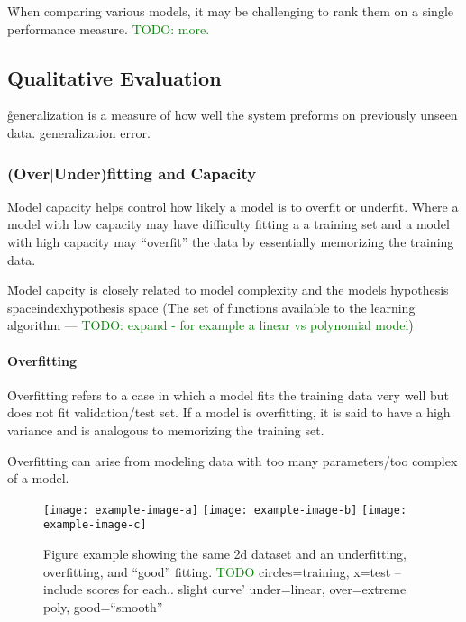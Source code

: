 \r{When comparing various models, it may be challenging to rank them on a single performance measure. \textcolor{green}{TODO: more.}}

\subsection{Qualitative Evaluation}

\r{generalization is a measure of how well the system preforms on previously unseen data. generalization error.}



\subsubsection{(Over$|$Under)fitting and Capacity}

\r{{Model capacity} helps control how likely a model is to overfit or underfit. Where a model with low capacity may have difficulty fitting a a training set and a model with high capacity may ``overfit'' the data by essentially memorizing the training data.}

\r{Model capcity is closely related to model complexity and the models {hypothesis space}index{hypothesis space} (The set of functions available to the learning algorithm --- \textcolor{green}{TODO: expand - for example a linear vs polynomial model})}


\paragraph{Overfitting}

\r{Overfitting refers to a case in which a model fits the training data very well but does not fit validation/test set. If a model is overfitting, it is said to have a high variance and is analogous to memorizing the training set.}

\r{Overfitting can arise from modeling data with too many parameters/too complex of a model.}



\begin{figure}[htp]
	\centering
	\texttt{[image: example-image-a]}\hfil
	\texttt{[image: example-image-b]}\hfil
	\texttt{[image: example-image-c]}\hfil
	\caption{Figure example showing the same 2d dataset and an underfitting, overfitting, and ``good'' fitting. \textcolor{green}{TODO} circles=training, x=test -- include scores for each.. slight curve' under=linear, over=extreme poly, good=``smooth''}
	\label{fig:basics_eval_fitting_examples}
\end{figure}

